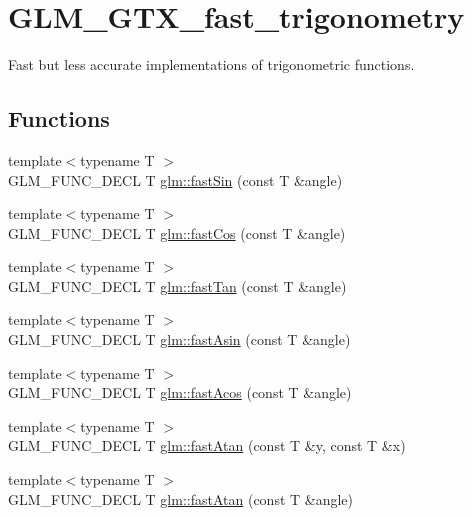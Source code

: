\hypertarget{group__gtx__fast__trigonometry}{}\section{G\+L\+M\+\_\+\+G\+T\+X\+\_\+fast\+\_\+trigonometry}
\label{group__gtx__fast__trigonometry}


Fast but less accurate implementations of trigonometric functions.  


\subsection*{Functions}
\begin{DoxyCompactItemize}
\item 
{\footnotesize template$<$typename T $>$ }\\G\+L\+M\+\_\+\+F\+U\+N\+C\+\_\+\+D\+E\+CL T \hyperlink{group__gtx__fast__trigonometry_ga01b7dc431bf5f5e6acce7d6bba311f86}{glm\+::fast\+Sin} (const T \&angle)
\item 
{\footnotesize template$<$typename T $>$ }\\G\+L\+M\+\_\+\+F\+U\+N\+C\+\_\+\+D\+E\+CL T \hyperlink{group__gtx__fast__trigonometry_gad54184beaba79e41db71a1f5711380c4}{glm\+::fast\+Cos} (const T \&angle)
\item 
{\footnotesize template$<$typename T $>$ }\\G\+L\+M\+\_\+\+F\+U\+N\+C\+\_\+\+D\+E\+CL T \hyperlink{group__gtx__fast__trigonometry_gae6615cdb40d8dc58115a07a21f495561}{glm\+::fast\+Tan} (const T \&angle)
\item 
{\footnotesize template$<$typename T $>$ }\\G\+L\+M\+\_\+\+F\+U\+N\+C\+\_\+\+D\+E\+CL T \hyperlink{group__gtx__fast__trigonometry_gab8595a77c5b215b95f662238dc3ff722}{glm\+::fast\+Asin} (const T \&angle)
\item 
{\footnotesize template$<$typename T $>$ }\\G\+L\+M\+\_\+\+F\+U\+N\+C\+\_\+\+D\+E\+CL T \hyperlink{group__gtx__fast__trigonometry_ga44e6efc3e776a51645fdf998e3e4f11b}{glm\+::fast\+Acos} (const T \&angle)
\item 
{\footnotesize template$<$typename T $>$ }\\G\+L\+M\+\_\+\+F\+U\+N\+C\+\_\+\+D\+E\+CL T \hyperlink{group__gtx__fast__trigonometry_gaf6234384b94846e29cf2c51dc245d484}{glm\+::fast\+Atan} (const T \&y, const T \&x)
\item 
{\footnotesize template$<$typename T $>$ }\\G\+L\+M\+\_\+\+F\+U\+N\+C\+\_\+\+D\+E\+CL T \hyperlink{group__gtx__fast__trigonometry_ga49b3b2b777b83eeed3e11205e800027e}{glm\+::fast\+Atan} (const T \&angle)
\end{DoxyCompactItemize}


